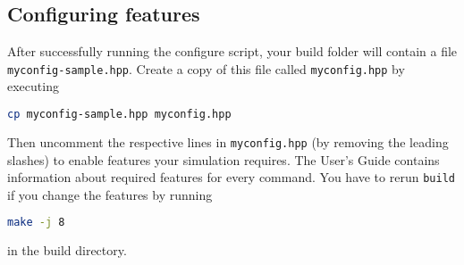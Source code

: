\documentclass[
paper=a4,                       %
fontsize=11pt,                  %
headinclude=false,              %
footinclude=false,              %
pagesize,                       %
]{scrartcl}
\begin{document}
\subsection{Configuring features}
%
After successfully running the configure script, your build folder will contain a file \texttt{myconfig-sample.hpp}. Create a copy of this file called \texttt{myconfig.hpp} by executing
%
\begin{lstlisting}[language=bash]
cp myconfig-sample.hpp myconfig.hpp
\end{lstlisting}
%
Then uncomment the respective lines in \texttt{myconfig.hpp} (by removing the leading slashes) to enable features your simulation requires. The User's Guide contains information about required features for every \es{} command.
You have to rerun \verb!build! if you change the features by running
\begin{lstlisting}[language=bash]
make -j 8
\end{lstlisting}
in the build directory.
\end{document}
